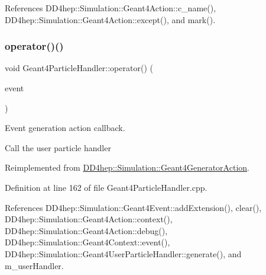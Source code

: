 References D\+D4hep\+::\+Simulation\+::\+Geant4\+Action\+::c\+\_\+name(), D\+D4hep\+::\+Simulation\+::\+Geant4\+Action\+::except(), and mark().

\hypertarget{class_d_d4hep_1_1_simulation_1_1_geant4_particle_handler_a239e9338d41588f5dcfc3ea012aba02a}{}\label{class_d_d4hep_1_1_simulation_1_1_geant4_particle_handler_a239e9338d41588f5dcfc3ea012aba02a} 
\subsubsection{\texorpdfstring{operator()()}{operator()()}}
{\footnotesize\ttfamily void Geant4\+Particle\+Handler\+::operator() (\begin{DoxyParamCaption}\item[{G4\+Event $\ast$}]{event }\end{DoxyParamCaption})\hspace{0.3cm}{\ttfamily [virtual]}}



Event generation action callback. 

Call the user particle handler 

Reimplemented from \hyperlink{class_d_d4hep_1_1_simulation_1_1_geant4_generator_action_ac5a1d2335a19e3f9d555081199e01801}{D\+D4hep\+::\+Simulation\+::\+Geant4\+Generator\+Action}.



Definition at line 162 of file Geant4\+Particle\+Handler.\+cpp.



References D\+D4hep\+::\+Simulation\+::\+Geant4\+Event\+::add\+Extension(), clear(), D\+D4hep\+::\+Simulation\+::\+Geant4\+Action\+::context(), D\+D4hep\+::\+Simulation\+::\+Geant4\+Action\+::debug(), D\+D4hep\+::\+Simulation\+::\+Geant4\+Context\+::event(), D\+D4hep\+::\+Simulation\+::\+Geant4\+User\+Particle\+Handler\+::generate(), and m\+\_\+user\+Handler.

\hypertarget{class_d_d4hep_1_1_simulation_1_1_geant4_particle_handler_a880488dc828d7e3a38a4332347608fc2}{}\label{class_d_d4hep_1_1_simulation_1_1_geant4_particle_handler_a880488dc828d7e3a38a4332347608fc2} 
